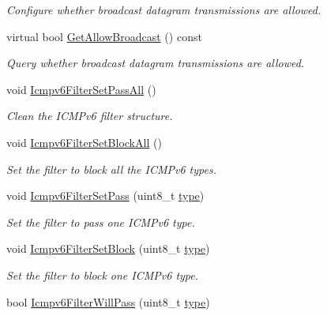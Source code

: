 \begin{DoxyCompactItemize}
\begin{DoxyCompactList}\small\item\em Configure whether broadcast datagram transmissions are allowed. \end{DoxyCompactList}\item 
virtual bool \hyperlink{classns3_1_1Ipv6RawSocketImpl_aa66f85c6c47363fb210cbe7153dd041f}{Get\+Allow\+Broadcast} () const 
\begin{DoxyCompactList}\small\item\em Query whether broadcast datagram transmissions are allowed. \end{DoxyCompactList}\item 
void \hyperlink{classns3_1_1Ipv6RawSocketImpl_afbbc42522b8999a4dc097255db47920d}{Icmpv6\+Filter\+Set\+Pass\+All} ()
\begin{DoxyCompactList}\small\item\em Clean the I\+C\+M\+Pv6 filter structure. \end{DoxyCompactList}\item 
void \hyperlink{classns3_1_1Ipv6RawSocketImpl_a12e988b66bdb489166a963251e744a0a}{Icmpv6\+Filter\+Set\+Block\+All} ()
\begin{DoxyCompactList}\small\item\em Set the filter to block all the I\+C\+M\+Pv6 types. \end{DoxyCompactList}\item 
void \hyperlink{classns3_1_1Ipv6RawSocketImpl_aea0f1182fba44167195eaf8990a5e7b6}{Icmpv6\+Filter\+Set\+Pass} (uint8\+\_\+t \hyperlink{visualizer-ideas_8txt_add98db9e15e2a58cf2b57623e7aa893a}{type})
\begin{DoxyCompactList}\small\item\em Set the filter to pass one I\+C\+M\+Pv6 type. \end{DoxyCompactList}\item 
void \hyperlink{classns3_1_1Ipv6RawSocketImpl_a2f850eddcc724122f7a287fee390fa4d}{Icmpv6\+Filter\+Set\+Block} (uint8\+\_\+t \hyperlink{visualizer-ideas_8txt_add98db9e15e2a58cf2b57623e7aa893a}{type})
\begin{DoxyCompactList}\small\item\em Set the filter to block one I\+C\+M\+Pv6 type. \end{DoxyCompactList}\item 
bool \hyperlink{classns3_1_1Ipv6RawSocketImpl_aa980b224df04ec9341eb6407cd9947df}{Icmpv6\+Filter\+Will\+Pass} (uint8\+\_\+t \hyperlink{visualizer-ideas_8txt_add98db9e15e2a58cf2b57623e7aa893a}{type})

\end{DoxyCompactItemize}
